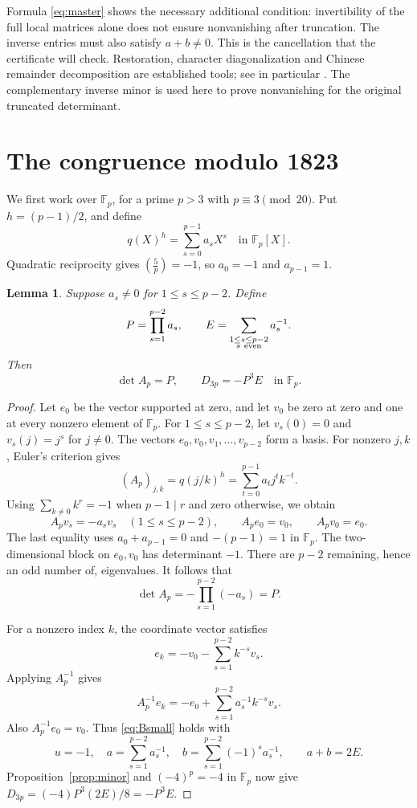 \documentclass[11pt,a4paper]{article}
\newtheorem{lemma}[theorem]{Lemma}
\theoremstyle{remark}
\newcommand{\F}{\mathbb F}
\newcommand{\jac}[2]{\left(\frac{#1}{#2}\right)}
\begin{document}
Formula \eqref{eq:master} shows the necessary additional condition:
invertibility of the full local matrices alone does not ensure
nonvanishing after truncation. The inverse entries must also satisfy
\(a+b\ne0\). This is the cancellation that the certificate will check.
Restoration, character diagonalization and Chinese remainder
decomposition are established tools; see in particular
\cite[\S1.2, Lemmas~2.1 and~2.4]{LiYan2026}.
The complementary inverse minor is used here to prove nonvanishing
for the original truncated determinant.

\section{The congruence modulo 1823}\label{sec:sun-prime}

We first work over \(\F_p\), for a prime \(p>3\) with \(p\equiv3\pmod{20}\).
Put \(h=(p-1)/2\), and define
\begin{equation}\label{eq:coeffs}
q(X)^h=\sum_{s=0}^{p-1}a_sX^s\quad\text{in }\F_p[X].
\end{equation}
Quadratic reciprocity gives \(\jac5p=-1\), so \(a_0=-1\) and
\(a_{p-1}=1\).

\begin{lemma}\label{lem:prime}
Suppose \(a_s\ne0\) for \(1\le s\le p-2\). Define
\[
P=\prod_{s=1}^{p-2}a_s,\qquad
E=\sum_{\substack{1\le s\le p-2\\s\ {\rm even}}}a_s^{-1}.
\]
Then
\begin{equation}\label{eq:prime-formula}
\det A_p=P,\qquad D_{3p}=-P^3E\quad\text{in }\F_p.
\end{equation}
\end{lemma}
\begin{proof}
Let \(e_0\) be the vector supported at zero, and let \(v_0\) be
zero at zero and one at every nonzero element of \(\F_p\).
For \(1\le s\le p-2\), let \(v_s(0)=0\) and \(v_s(j)=j^s\)
for \(j\ne0\).
The vectors \(e_0,v_0,v_1,\ldots,v_{p-2}\) form a basis.
For nonzero \(j,k\), Euler's criterion gives
\[
(A_p)_{j,k}=q(j/k)^h=\sum_{t=0}^{p-1}a_tj^tk^{-t}.
\]
Using \(\sum_{k\ne0}k^r=-1\) when \(p-1\mid r\) and zero
otherwise, we obtain
\[
A_pv_s=-a_sv_s\quad(1\le s\le p-2),\qquad
A_pe_0=v_0,\qquad A_pv_0=e_0.
\]
The last equality uses \(a_0+a_{p-1}=0\) and
\(-(p-1)=1\) in \(\F_p\).
The two-dimensional block on \(e_0,v_0\) has determinant \(-1\).
There are \(p-2\) remaining, hence an odd number of, eigenvalues.
It follows that
\[
\det A_p=-\prod_{s=1}^{p-2}(-a_s)=P.
\]

For a nonzero index \(k\), the coordinate vector satisfies
\[
e_k=-v_0-\sum_{s=1}^{p-2}k^{-s}v_s.
\]
Applying \(A_p^{-1}\) gives
\[
A_p^{-1}e_k=-e_0+\sum_{s=1}^{p-2}a_s^{-1}k^{-s}v_s.
\]
Also \(A_p^{-1}e_0=v_0\). Thus \eqref{eq:Bsmall} holds with
\[
u=-1,\quad
a=\sum_{s=1}^{p-2}a_s^{-1},\quad
b=\sum_{s=1}^{p-2}(-1)^sa_s^{-1},
\qquad a+b=2E.
\]
Proposition~\ref{prop:minor} and \((-4)^p=-4\) in \(\F_p\)
now give \(D_{3p}=(-4)P^3(2E)/8=-P^3E\).
\end{proof}
\end{document}
